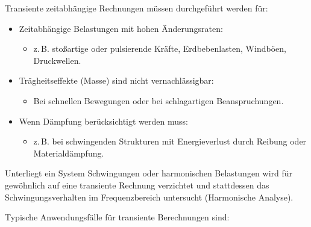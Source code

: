 \documentclass[letterpaper,10pt,german]{jupyterBook}
\begin{document}
\sphinxAtStartPar
Transiente zeitabhängige Rechnungen müssen durchgeführt werden für:
\begin{itemize}
\item {} 
\sphinxAtStartPar
Zeitabhängige Belastungen mit hohen Änderungsraten:
\begin{itemize}
\item {} 
\sphinxAtStartPar
z. B. stoßartige oder pulsierende Kräfte, Erdbebenlasten, Windböen, Druckwellen.

\end{itemize}

\item {} 
\sphinxAtStartPar
Trägheitseffekte (Masse) sind nicht vernachlässigbar:
\begin{itemize}
\item {} 
\sphinxAtStartPar
Bei schnellen Bewegungen oder bei schlagartigen Beanspruchungen.

\end{itemize}

\item {} 
\sphinxAtStartPar
Wenn Dämpfung berücksichtigt werden muss:
\begin{itemize}
\item {} 
\sphinxAtStartPar
z. B. bei schwingenden Strukturen mit Energieverlust durch Reibung oder Materialdämpfung.

\end{itemize}

\end{itemize}



\sphinxAtStartPar
Unterliegt ein System Schwingungen oder harmonischen Belastungen wird für gewöhnlich auf eine transiente Rechnung verzichtet und stattdessen das Schwingungsverhalten im Frequenzbereich untersucht (Harmonische Analyse).

\sphinxAtStartPar
Typische Anwendungsfälle für transiente Berechnungen sind:
\end{document}

